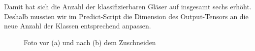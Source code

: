 Damit hat sich die Anzahl der klassifizierbaren Gläser auf insgesamt sechs erhöht. Deshalb mussten wir im Predict-Script die Dimension des Output-Tensors an die neue Anzahl der Klassen entsprechend anpassen.

\begin{figure}
	\centering
	\caption{Foto vor (a) und nach (b) dem Zuschneiden}
	\label{fig:vergleich_glas_zuschnitt}
\end{figure}